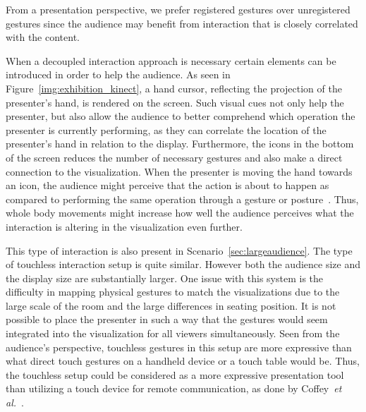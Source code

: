 \documentclass[journal]{vgtc}                %
\begin{document}
From a presentation perspective, we prefer registered gestures over unregistered gestures since the audience may benefit from interaction that is closely correlated with the content.
 
When a decoupled interaction approach is necessary certain elements can be introduced in order to help the audience.
As seen in Figure~\ref{img:exhibition_kinect}, a hand cursor, reflecting the projection of the presenter's hand, is rendered on the screen.
Such visual cues not only help the presenter, but also allow the audience to better comprehend which operation the presenter is currently performing, as they can correlate the location of the presenter's hand in relation to the display.
Furthermore, the icons in the bottom of the screen reduces the number of necessary gestures and also make a direct connection to the visualization.
When the presenter is moving the hand towards an icon, the audience might perceive that the action is about to happen as compared to performing the same operation through a gesture or posture~\cite{isenberg:hal-00781237}. 
Thus, whole body movements \cite{978-0-85729-432-6, Shoemaker:2010:BIT:1868914.1868967} might increase how well the audience perceives what the interaction is altering in the visualization even further.

This type of interaction is also present in Scenario~\ref{sec:largeaudience}. The type of touchless interaction setup is quite similar. 
However both the audience size and the display size are substantially larger.
One issue with this system is the difficulty in mapping physical gestures to match the visualizations due to the large scale of the room and the large differences in seating position.
It is not possible to place the presenter in such a way that the gestures would seem integrated into the visualization for all viewers simultaneously.
Seen from the audience's perspective, touchless gestures in this setup are more expressive than what direct touch gestures on a handheld device or a touch table would be.
Thus, the touchless setup could be considered as a more expressive presentation tool than utilizing a touch device for remote communication, as done by Coffey~\textit{et al.}~\cite{Coffey:2012:ISW:2360744.2360843}.



\end{document}
